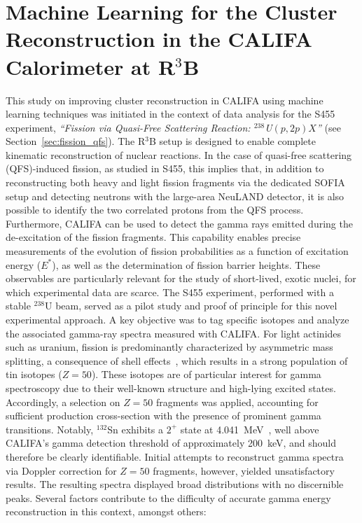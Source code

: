 \section{Machine Learning for the Cluster Reconstruction in the CALIFA Calorimeter at R$^3$B}

This study on improving cluster reconstruction in CALIFA using machine learning techniques was initiated in the context of data analysis for the S455 experiment, \textit{``Fission via Quasi-Free Scattering Reaction: $^{238}$U$(p,2p)X$''} (see Section~\ref{sec:fission_qfs}). The R$^3$B setup is designed to enable complete kinematic reconstruction of nuclear reactions. In the case of quasi-free scattering (QFS)-induced fission, as studied in S455, this implies that, in addition to reconstructing both heavy and light fission fragments via the dedicated SOFIA setup and detecting neutrons with the large-area NeuLAND detector, it is also possible to identify the two correlated protons from the QFS process. Furthermore, CALIFA can be used to detect the gamma rays emitted during the de-excitation of the fission fragments.\newline
This capability enables precise measurements of the evolution of fission probabilities as a function of excitation energy ($E^*$), as well as the determination of fission barrier heights. These observables are particularly relevant for the study of short-lived, exotic nuclei, for which experimental data are scarce.\newline
The S455 experiment, performed with a stable $^{238}$U beam, served as a pilot study and proof of principle for this novel experimental approach. A key objective was to tag specific isotopes and analyze the associated gamma-ray spectra measured with CALIFA. For light actinides such as uranium, fission is predominantly characterized by asymmetric mass splitting, a consequence of shell effects~\cite{sartori2013nuclear}, which results in a strong population of tin isotopes ($Z = 50$). These isotopes are of particular interest for gamma spectroscopy due to their well-known structure and high-lying excited states. Accordingly, a selection on $Z = 50$ fragments was applied, accounting for sufficient production cross-section with the presence of prominent gamma transitions. Notably, $^{132}$Sn exhibits a $2^+$ state at 4.041~MeV~\cite{schopper2013excited}, well above CALIFA's gamma detection threshold of approximately 200~keV, and should therefore be clearly identifiable.\newline
Initial attempts to reconstruct gamma spectra via Doppler correction for $Z = 50$ fragments, however, yielded unsatisfactory results. The resulting spectra displayed broad distributions with no discernible peaks. Several factors contribute to the difficulty of accurate gamma energy reconstruction in this context, amongst others:\newline
